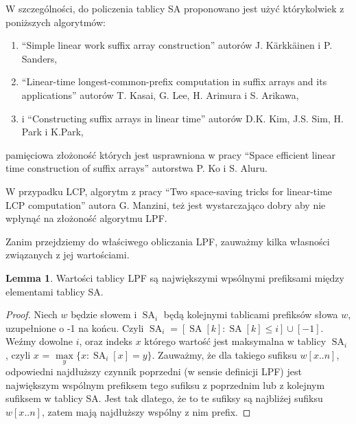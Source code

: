 \documentclass[a4paper,12pt]{article}
\theoremstyle{definition}
\newtheorem{lemma}{Lemma}[section]
\DeclareMathOperator{\SA}{SA}
\begin{document}
\pagebreak

W szczególności, do policzenia tablicy SA proponowano jest użyć którykolwiek z poniższych algorytmów:
\begin{enumerate}
\item ``Simple linear work suffix array construction'' autorów J. Kärkkäinen i P. Sanders,
\item ``Linear-time longest-common-prefix computation in suffix arrays and its applications'' autorów T. Kasai, G. Lee, H. Arimura i S. Arikawa,
\item i ``Constructing suffix arrays in linear time'' autorów D.K. Kim, J.S. Sim, H. Park i K.Park,
\end{enumerate}
pamięciowa złożoność których jest usprawniona w pracy ``Space efficient linear time construction of suffix arrays'' autorstwa P. Ko i S. Aluru.

W przypadku LCP, algorytm z pracy ``Two space-saving tricks for linear-time LCP computation'' autora G. Manzini,
 też jest wystarczająco dobry aby nie wpłynąć na złożoność algorytmu LPF.

Zanim przejdziemy do właściwego obliczania LPF, zauważmy kilka własności związanych z jej wartościami.

\begin{lemma}

Wartości tablicy LPF są największymi wpsólnymi prefiksami między elementami tablicy SA.

\begin{proof}

Niech $w$ będzie słowem i $\SA_{i}$ będą kolejnymi tablicami prefiksów słowa $w$, uzupełnione o -1 na końcu.
Czyli $\SA_{i} = [ \SA[k] : \SA[k] \leq i ] \cup [-1]$.
Weźmy dowolne $i$, oraz indeks $x$ którego wartość jest maksymalna w tablicy $\SA_{i}$,
 czyli $x$ = $\max\limits_{y} \{ x : \SA_{i}[x] = y \}$.
Zauważmy, że dla takiego sufiksu $w[x .. n]$, odpowiedni najdłuższy czynnik poprzedni (w sensie definicji LPF)
 jest największym wspólnym prefiksem tego sufiksu z poprzednim lub z kolejnym sufiksem w tablicy SA.
Jest tak dlatego, że to te sufiksy są najbliżej sufiksu $w[x .. n]$, zatem mają najdłuższy wspólny z nim prefix.

\end{proof}
\end{lemma}
\end{document}
